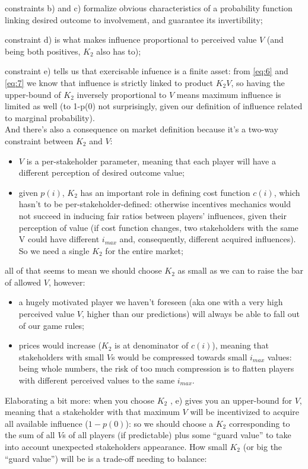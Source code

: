 \documentclass[10pt,a4paper]{article}
\begin{document}
	constraints b) and c) formalize obvious characteristics of a probability function linking desired outcome to involvement, and guarantee its invertibility;
	
	constraint d) is what makes influence proportional to perceived value $V$ (and being both positives, $K_{2}$ also has to);
	
	constraint e) tells us that exercisable infuence is a finite asset: from \ref{eq:6} and \ref{eq:7} we know that influence is strictly linked to product $K_{2}V$, so having the upper-bound of $K_{2}$ inversely proportional to $V$ means maximum influence is limited as well (to 1-p(0) not surprisingly, given our definition of influence related to marginal probability).\\
	And there’s also a consequence on market definition because it’s a two-way constraint between $K_{2}$ and $V$:
	\begin{itemize}
		\item $V$ is a per-stakeholder parameter, meaning that each player will have a different perception of desired outcome value;
		\item given $p(i)$, $K_{2}$ has an important role in defining cost function $c(i)$, which hasn’t to be per-stakeholder-defined: otherwise incentives mechanics would not succeed in inducing fair ratios between players’ influences, given their perception of value (if cost function changes, two stakeholders with the same V could have different $i_{max}$ and, consequently, different acquired influences). So we need a single $K_{2}$ for the entire market;
	\end{itemize}
	all of that seems to mean we should choose $K_{2}$ as small as we can to raise the bar of allowed $V$, however:
	\begin{itemize}
		\item a hugely motivated player we haven’t foreseen (aka one with a very high perceived value $V$, higher than our predictions) will always be able to fall out of our game rules;
		\item prices would increase ($K_{2}$ is at denominator of $c(i)$), meaning that stakeholders with small $V$s would be compressed towards small $i_{max}$ values: being whole numbers, the risk of too much compression is to flatten players with different perceived values to the same $i_{max}$.
	\end{itemize}
	Elaborating a bit more: when you choose $K_{2}$ , e) gives you an upper-bound for $V$, meaning that a stakeholder with that maximum $V$ will be incentivized to acquire all available influence ($1-p(0)$): so we should choose a $K_{2}$ corresponding to the sum of all $V$s of all players (if predictable) plus some \enquote{guard value} to take into account unexpected stakeholders appearance. How small $K_{2}$ (or big the \enquote{guard value}) will be is a trade-off needing to balance:
\end{document}
